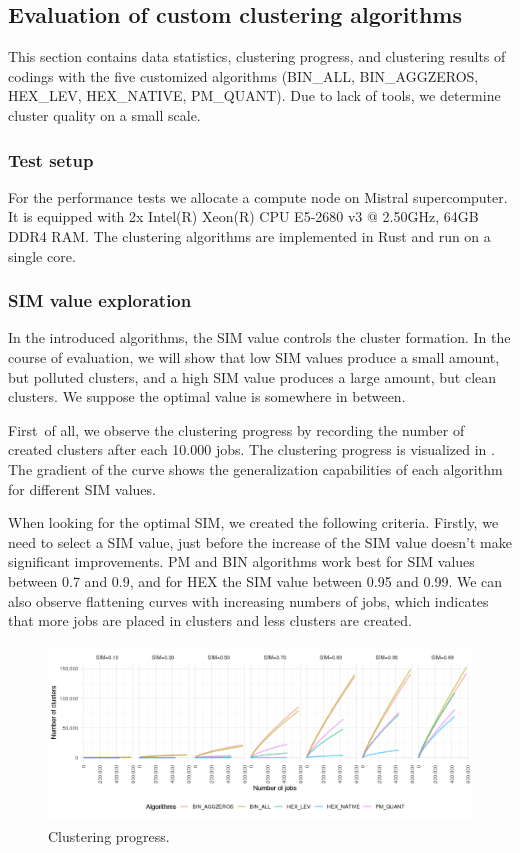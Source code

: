 \documentclass[]{llncs}
\begin{document}
\subsection{Evaluation of custom clustering algorithms}
This section contains data statistics, clustering progress, and clustering results of codings with the five customized algorithms (BIN\_ALL, BIN\_AGGZEROS, HEX\_LEV, HEX\_NATIVE, PM\_QUANT).
Due to lack of tools, we determine cluster quality on a small scale.

\subsubsection{Test setup}
For the performance tests we allocate a compute node on Mistral supercomputer.
It is equipped with 2x Intel(R) Xeon(R) CPU E5-2680 v3 @ 2.50GHz, 64GB DDR4 RAM.
The clustering algorithms are implemented in Rust and run on a single core.

\subsubsection{SIM value exploration}
In the introduced algorithms, the SIM value controls the cluster formation.
In the course of evaluation, we will show that low SIM values produce a small amount, but polluted clusters, and a high SIM value produces a large amount, but clean clusters.
We suppose the optimal value is somewhere in between.

First\ of all, we observe the clustering progress by recording  the number of created clusters after each 10.000 jobs.
The clustering progress is visualized in .
The gradient of the curve shows the generalization capabilities of each algorithm for different SIM values.

When looking for the optimal SIM, we created the following criteria.
Firstly, we need to select a SIM value, just before the increase of the SIM value doesn’t make significant improvements.
PM and BIN algorithms work best for SIM values between 0.7 and 0.9, and for HEX the SIM value between 0.95 and 0.99.
We can also observe flattening curves with increasing numbers of jobs, which indicates that more jobs are placed in clusters and less clusters are created.

\begin{figure}
  \centering
   \includegraphics[width=4.61in,height=1.85in]{./media/image15.png}
   \caption{Clustering progress.}
   \label{fig:clustering_progress}
\end{figure}
\end{document}
